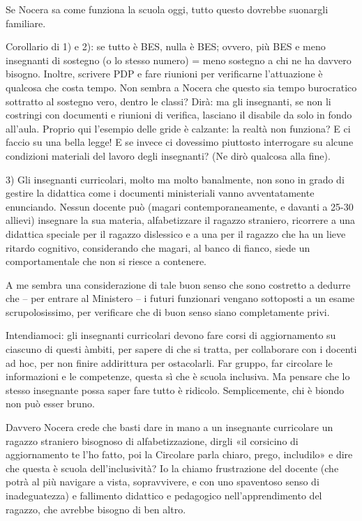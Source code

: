 Se Nocera sa come funziona la scuola oggi, tutto questo dovrebbe suonargli familiare.

Corollario di 1) e 2): se tutto è BES, nulla è BES; ovvero, più BES e meno insegnanti di sostegno (o lo stesso numero) = meno sostegno a chi ne ha davvero bisogno. Inoltre, scrivere PDP e fare riunioni per verificarne l’attuazione è qualcosa che costa tempo. Non sembra a Nocera che questo sia tempo burocratico sottratto al sostegno vero, dentro le classi? Dirà: ma gli insegnanti, se non li costringi con documenti e riunioni di verifica, lasciano il disabile da solo in fondo all’aula. Proprio qui l’esempio delle gride è calzante: la realtà non funziona? E ci faccio su una bella legge! E se invece ci dovessimo piuttosto interrogare su alcune condizioni materiali del lavoro degli insegnanti? (Ne dirò qualcosa alla fine).

3) Gli insegnanti curricolari, molto ma molto banalmente, non sono in grado di gestire la didattica come i documenti ministeriali vanno avventatamente enunciando. Nessun docente può (magari contemporaneamente, e davanti a 25-30 allievi) insegnare la sua materia, alfabetizzare il ragazzo straniero, ricorrere a una didattica speciale per il ragazzo dislessico e a una per il ragazzo che ha un lieve ritardo cognitivo, considerando che magari, al banco di fianco, siede un comportamentale che non si riesce a contenere.

A me sembra una considerazione di tale buon senso che sono costretto a dedurre che – per entrare al Ministero – i futuri funzionari vengano sottoposti a un esame scrupolosissimo, per verificare che di buon senso siano completamente privi.

Intendiamoci: gli insegnanti curricolari devono fare corsi di aggiornamento su ciascuno di questi àmbiti, per sapere di che si tratta, per collaborare con i docenti ad hoc, per non finire addirittura per ostacolarli. Far gruppo, far circolare le informazioni e le competenze, questa sì che è scuola inclusiva. Ma pensare che lo stesso insegnante possa saper fare tutto è ridicolo. Semplicemente, chi è biondo non può esser bruno.

Davvero Nocera crede che basti dare in mano a un insegnante curricolare un ragazzo straniero bisognoso di alfabetizzazione, dirgli «il corsicino di aggiornamento te l’ho fatto, poi la Circolare parla chiaro, prego, includilo» e dire che questa è scuola dell’inclusività? Io la chiamo frustrazione del docente (che potrà al più navigare a vista, sopravvivere, e con uno spaventoso senso di inadeguatezza) e fallimento didattico e pedagogico nell’apprendimento del ragazzo, che avrebbe bisogno di ben altro.

